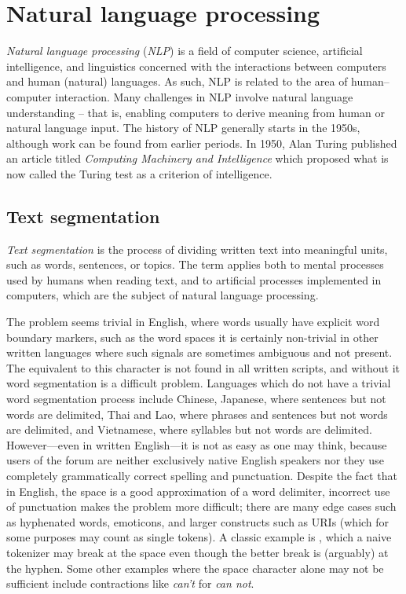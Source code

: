 \chapter{Natural language processing}

  \emph{Natural language processing} (\emph{NLP}) is a field of computer science, artificial intelligence, and linguistics concerned with the interactions between computers and human (natural) languages. As such, NLP is related to the area of human–computer interaction. Many challenges in NLP involve natural language understanding -- that is, enabling computers to derive meaning from human or natural language input. The history of NLP generally starts in the 1950s, although work can be found from earlier periods. In 1950, Alan Turing published an article titled \emph{Computing Machinery and Intelligence} which proposed what is now called the Turing test as a criterion of intelligence\cite{Turing1950}.

  \section{Text segmentation}

    \emph{Text segmentation} is the process of dividing written text into meaningful units, such as words, sentences, or topics. The term applies both to mental processes used by humans when reading text, and to artificial processes implemented in computers, which are the subject of natural language processing. 
      
    The problem seems trivial in English, where words usually have explicit word boundary markers, such as the word spaces it is certainly non-trivial in other written languages where such signals are sometimes ambiguous and not present. The equivalent to this character is not found in all written scripts, and without it word segmentation is a difficult problem. Languages which do not have a trivial word segmentation process include Chinese, Japanese, where sentences but not words are delimited, Thai and Lao, where phrases and sentences but not words are delimited, and Vietnamese, where syllables but not words are delimited. However---even in written English---it is not as easy as one may think, because users of the forum are neither exclusively native English speakers nor they use completely grammatically correct spelling and punctuation. Despite the fact that in English, the space is a good approximation of a word delimiter, incorrect use of punctuation makes the problem more difficult; there are many edge cases such as hyphenated words, emoticons, and larger constructs such as URIs (which for some purposes may count as single tokens). A classic example is , which a naive tokenizer may break at the space even though the better break is (arguably) at the hyphen. Some other examples where the space character alone may not be sufficient include contractions like \emph{can't} for \emph{can not}.
      
